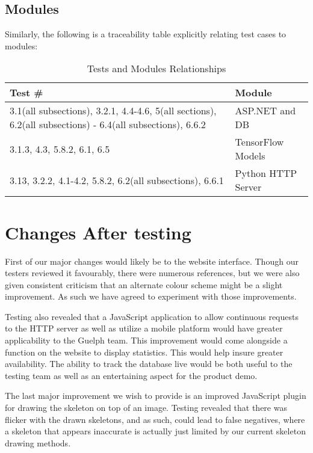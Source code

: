 \documentclass{scrreprt}
\begin{document}
\section{Modules}
Similarly, the following is a traceability table explicitly relating test cases to modules:\\
\begin{table}
\caption{Tests and Modules Relationships}
\begin{center}
\begin{tabular}{p{6cm} p{4cm}}
\hline
\textbf Test \#  & Module \\
\hline
3.1(all subsections), 3.2.1, 4.4-4.6, 5(all sections), 6.2(all subsections) - 6.4(all subsections), 6.6.2 & ASP.NET and DB \\
\hline
3.1.3, 4.3, 5.8.2, 6.1, 6.5 & TensorFlow Models \\
\hline
3.13, 3.2.2, 4.1-4.2, 5.8.2, 6.2(all subsections), 6.6.1 & Python HTTP Server\\
\hline
\end{tabular}
\end{center}
\end{table}

\chapter{Changes After testing}

First of our major changes would likely be to the website interface. Though our
testers reviewed it favourably, there were numerous references, but we were also
given consistent criticism that an alternate colour scheme might be a slight
improvement. As such we have agreed to experiment with those improvements.

Testing also revealed that a JavaScript application to allow continuous requests
to the HTTP server as well as utilize a mobile platform would have greater
applicability to the Guelph team. This improvement would come alongside a
function on the website to display statistics. This would help insure greater
availability. The ability to track the database live would be both useful to
the testing team as well as an entertaining aspect for the product demo.

The last major improvement we wish to provide is an improved JavaScript plugin
for drawing the skeleton on top of an image. Testing revealed that there was
flicker with the drawn skeletons, and as such, could lead to false negatives,
where a skeleton that appears inaccurate is actually just limited by our
current skeleton drawing methods.
\end{document}
